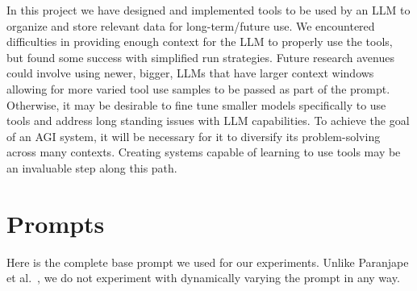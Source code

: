 \documentclass{article}
\begin{document}
In this project we have designed and implemented tools to be used by an LLM to organize and store relevant data for long-term/future use.
We encountered difficulties in providing enough context for the LLM to properly use the tools, but found some success with simplified run strategies.
Future research avenues could involve using newer, bigger, LLMs that have larger context windows allowing for more varied tool use samples to be passed as part of the prompt.
Otherwise, it may be desirable to fine tune smaller models specifically to use tools and address long standing issues with LLM capabilities.
To achieve the goal of an AGI system, it will be necessary for it to diversify its problem-solving across many contexts.
Creating systems capable of learning to use tools may be an invaluable step along this path.





\appendix

\section{Prompts}\label{section:prompts}

Here is the complete base prompt we used for our experiments. Unlike Paranjape et al.~\cite{paranjape2023art}, we do not experiment with dynamically varying the prompt in any way.
\end{document}
